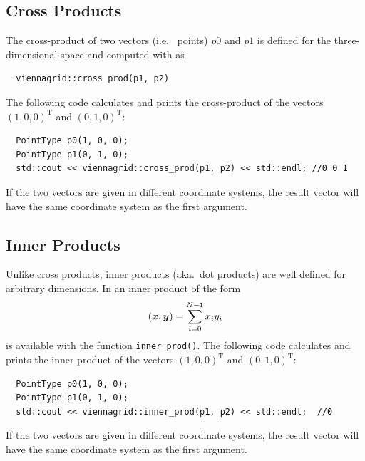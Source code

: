   \subsection{Cross Products}
 The cross-product of two vectors (i.e.~{\ViennaGrid} points) $p0$ and $p1$ is defined for the three-dimensional space and computed with {\ViennaGrid} as
 \begin{lstlisting}
  viennagrid::cross_prod(p1, p2)
 \end{lstlisting}
 The following code calculates and prints the cross-product of the vectors $(1,0,0)^\mathrm{T}$ and $(0,1,0)^\mathrm{T}$:
 \begin{lstlisting}
  PointType p0(1, 0, 0);
  PointType p1(0, 1, 0);
  std::cout << viennagrid::cross_prod(p1, p2) << std::endl; //0 0 1
 \end{lstlisting}
 If the two vectors are given in different coordinate systems, the result vector will have the same coordinate system as the first argument.
  

  \subsection{Inner Products}
 Unlike cross products, inner products (aka.~dot products) are well defined for arbitrary dimensions. In {\ViennaGridversion} an inner product of the form
\begin{align}
 (\boldsymbol{x}, \boldsymbol{y}) = \sum_{i=0}^{N-1} x_i y_i
\end{align}
is available with the function \lstinline|inner_prod()|. The following code calculates and prints the inner product of the vectors $(1,0,0)^\mathrm{T}$ and $(0,1,0)^\mathrm{T}$:
 \begin{lstlisting}
  PointType p0(1, 0, 0);
  PointType p1(0, 1, 0);
  std::cout << viennagrid::inner_prod(p1, p2) << std::endl;  //0
 \end{lstlisting}
 If the two vectors are given in different coordinate systems, the result vector will have the same coordinate system as the first argument.
 
